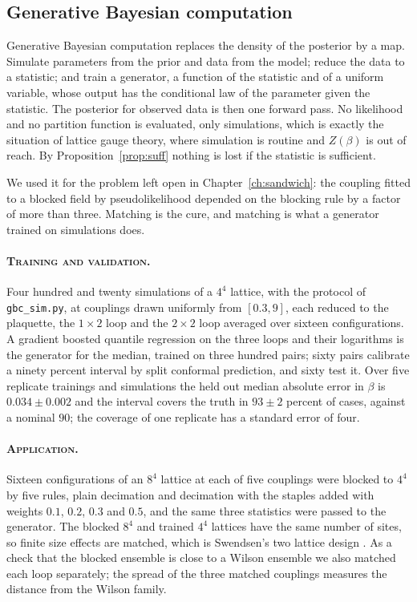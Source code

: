 \subsection{Generative Bayesian computation}

Generative Bayesian computation replaces the density of the posterior by a map. Simulate parameters from the prior and data from the model; reduce the data to a statistic; and train a generator, a function of the statistic and of a uniform variable, whose output has the conditional law of the parameter given the statistic. The posterior for observed data is then one forward pass. No likelihood and no partition function is evaluated, only simulations, which is exactly the situation of lattice gauge theory, where simulation is routine and $Z(\beta)$ is out of reach. By Proposition~\ref{prop:suff} nothing is lost if the statistic is sufficient.

We used it for the problem left open in Chapter~\ref{ch:sandwich}: the coupling fitted to a blocked field by pseudolikelihood depended on the blocking rule by a factor of more than three. Matching is the cure, and matching is what a generator trained on simulations does.

\paragraph{\normalfont\scshape Training and validation.} Four hundred and twenty simulations of a $4^4$ lattice, with the protocol of \texttt{gbc\_sim.py}, at couplings drawn uniformly from $[0.3,9]$, each reduced to the plaquette, the $1\times2$ loop and the $2\times2$ loop averaged over sixteen configurations. A gradient boosted quantile regression on the three loops and their logarithms is the generator for the median, trained on three hundred pairs; sixty pairs calibrate a ninety percent interval by split conformal prediction, and sixty test it. Over five replicate trainings and simulations the held out median absolute error in $\beta$ is $0.034\pm0.002$ and the interval covers the truth in $93\pm2$ percent of cases, against a nominal $90$; the coverage of one replicate has a standard error of four.

\paragraph{\normalfont\scshape Application.} Sixteen configurations of an $8^4$ lattice at each of five couplings were blocked to $4^4$ by five rules, plain decimation and decimation with the staples added with weights $0.1$, $0.2$, $0.3$ and $0.5$, and the same three statistics were passed to the generator. The blocked $8^4$ and trained $4^4$ lattices have the same number of sites, so finite size effects are matched, which is Swendsen's two lattice design \cite{Sw79}. As a check that the blocked ensemble is close to a Wilson ensemble we also matched each loop separately; the spread of the three matched couplings measures the distance from the Wilson family.

